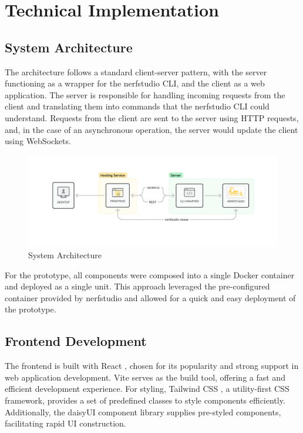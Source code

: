 %
\chapter{Technical Implementation}
\label{sec:system}

\section{System Architecture}
\label{sec:system:architecture}

The architecture follows a standard client-server pattern, with the server functioning as a wrapper for the nerfstudio CLI, and the client as a web application.
The server is responsible for handling incoming requests from the client and translating them into commands that the nerfstudio CLI could understand.
Requests from the client are sent to the server using HTTP requests, and, in the case of an asynchronous operation, the server would update the client using WebSockets.

\begin{figure}[htb]
	\includegraphics[width=\textwidth]{figures/architecture-1.png}
	\caption{System Architecture}
	\label{fig:system:example2}
\end{figure}

For the prototype, all components were composed into a single Docker \cite{noauthor_docker_2022} container and deployed as a single unit.
This approach leveraged the pre-configured container provided by nerfstudio and allowed for a quick and easy deployment of the prototype.

\section{Frontend Development} 
\label{sec:system:frontend}

The frontend is built with React \cite{noauthor_react_nodate}, chosen for its popularity and strong support in web application development.
Vite \cite{noauthor_vite_nodate} serves as the build tool, offering a fast and efficient development experience.
For styling, Tailwind CSS \cite{noauthor_tailwind_2020}, a utility-first CSS framework, provides a set of predefined classes to style components efficiently.
Additionally, the daisyUI \cite{noauthor_daisyui_nodate} component library supplies pre-styled components, facilitating rapid UI construction.

